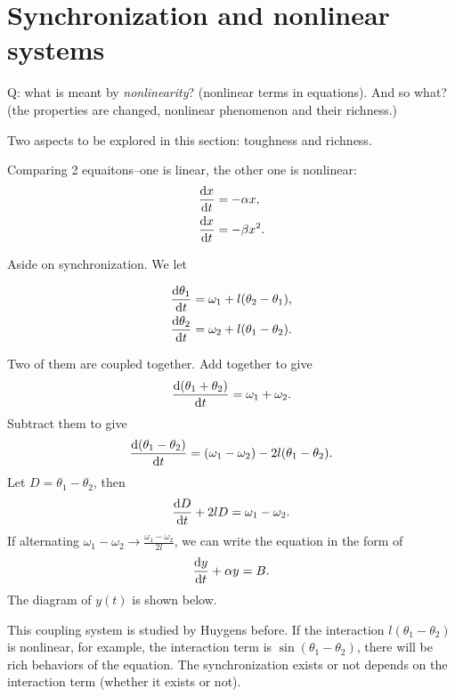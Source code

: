 \chapter {Synchronization and nonlinear systems}\label{chap:synchronization}
Q: what is meant by \textit{nonlinearity}? (nonlinear terms in equations). And so what? (the properties are changed, nonlinear phenomenon and their richness.) 

Two aspects to be explored in this section: toughness and richness.

Comparing 2 equaitons--one is linear, the other one is nonlinear:
\begin{align}
\frac{{\mathrm d} {x}}{{\mathrm d}t} &=-\alpha x,\label {examplelinear1}\\
\frac{{\mathrm d} {x}}{{\mathrm d}t} &=-\beta x^2.\label {examplenonlinear2}
\end{align}

Aside on synchronization. We let

\begin{align}
\frac{{\mathrm d} {\theta_1}}{{\mathrm d}t} &=\omega_1 + l(\theta_2-\theta_1),\label {coupling1}\\
\frac{{\mathrm d} {\theta_2}}{{\mathrm d}t} &= \omega_2 + l(\theta_1-\theta_2).\label {coupling2}
\end{align}

Two of them are coupled together. Add together to give
\begin{align}
\frac{{\mathrm d} {(\theta_1+ \theta_2)}}{{\mathrm d}t} = \omega_1 + \omega_2.
\end{align}
Subtract them to give
\begin{align}
\frac{{\mathrm d} {(\theta_1-\theta_2)}}{{\mathrm d}t}= (\omega_1 - \omega_2) -2l(\theta_1 - \theta_2).
\end{align}
Let $ D=\theta_1 - \theta_2  $, then 
\begin{align}
\frac{{\mathrm d} {D}}{{\mathrm d}t} + 2lD=\omega_1-\omega_2.
\end{align}
If alternating $ \omega_1-\omega_2 \rightarrow \frac{\omega_1-\omega_2}{2l}$, we can write the equation in the form of
\begin{align}
\frac{{\mathrm d} {y}}{{\mathrm d}t}+ \alpha y =B.
\end{align}
The diagram of $ y(t) $ is shown below.

This coupling system is studied by Huygens before. If the interaction $ l(\theta_1 - \theta_2) $ is nonlinear, for example, the interaction term is $ \sin(\theta_1- \theta_2) $, there will be rich behaviors of the equation. The synchronization exists or not depends on the interaction term (whether it exists or not). 

